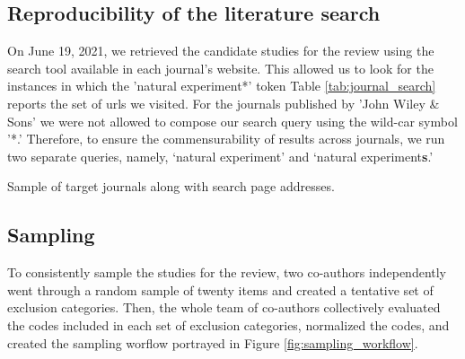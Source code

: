 \setcounter{table}{0}
\renewcommand{\thetable}{A\arabic{table}}
\renewcommand{\thefigure}{A\arabic{figure}}

\subsection{Reproducibility of the literature search}

On June 19, 2021, we retrieved the candidate studies for the review using the
search tool available in each journal's website. This allowed us to look for
the instances in which the 'natural experiment*' token 
Table \ref{tab:journal_search}
reports the set of urls we visited. For the journals published by 'John Wiley \&
Sons' we were not allowed to compose our search query using the wild-car symbol '*.'
Therefore, to ensure the commensurability of results across journals, we
run two separate queries, namely, `natural experiment' and `natural
experiment\textbf{s}.'

\begin{table}
  \centering
  \sffamily
  \begin{small}
    
  \end{small}
  \label{tab:journal_search}
  \caption{Sample of target journals along with search page addresses.}
\end{table}

\subsection{Sampling}

To consistently sample the studies for the review, two co-authors independently 
went through a random sample of twenty items and created a tentative set of
exclusion categories. Then, the whole team of co-authors collectively evaluated
the codes included in each set of exclusion categories, normalized the codes,
and created the sampling worflow portrayed in Figure \ref{fig:sampling_workflow}.

